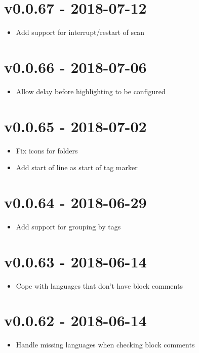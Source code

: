 \chapter{v0.0.67 - 2018-07-12}
\begin{itemize}
\item{Add support for interrupt/restart of scan}
\end{itemize}

\chapter{v0.0.66 - 2018-07-06}
\begin{itemize}
\item{Allow delay before highlighting to be configured}
\end{itemize}

\chapter{v0.0.65 - 2018-07-02}
\begin{itemize}
\item{Fix icons for folders}
\item{Add start of line as start of tag marker}
\end{itemize}

\chapter{v0.0.64 - 2018-06-29}
\begin{itemize}
\item{Add support for grouping by tags}
\end{itemize}

\chapter{v0.0.63 - 2018-06-14}
\begin{itemize}
\item{Cope with languages that don't have block comments}
\end{itemize}

\chapter{v0.0.62 - 2018-06-14}
\begin{itemize}
\item{Handle missing languages when checking block comments}
\end{itemize}

